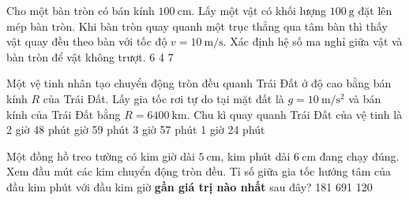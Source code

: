 \begin{ex}
	Cho một bàn tròn có bán kính $\SI{100}{\centi\meter}$. Lấy một vật có khối lượng $\SI{100}{\gram}$ đặt lên mép bàn tròn. Khi bàn tròn quay quanh một trục thẳng qua tâm bàn thì thấy vật quay đều theo bàn với tốc độ $v=\SI{10}{\meter/\second}$. Xác định hệ số ma nghỉ giữa vật và bàn tròn để vật không trượt.
	\choice
	{}
	{6}
	{4}
	{7}
\end{ex}
\begin{ex}
Một vệ tinh nhân tạo chuyển động tròn đều quanh Trái Đất ở độ cao bằng bán kính $R$ của Trái Đất. Lấy gia tốc rơi tự do tại mặt đất là $g=\SI{10}{\meter/\second^2}$ và bán kính của Trái Đất bằng $R=\SI{6400}{\kilo\meter}$. Chu kì quay quanh Trái Đất của vệ tinh là	
	\choice
	{2 giờ 48 phút}
	{ giờ 59 phút}
	{3 giờ 57 phút}
	{1 giờ 24 phút}
\end{ex}
\begin{ex}
	Một đồng hồ treo tường có kim giờ dài $\SI{5}{\centi\meter}$, kim phút dài $\SI{6}{\centi\meter}$ đang chạy đúng. Xem đầu mút các kim chuyển động tròn đều. Tỉ số giữa gia tốc hướng tâm của đầu kim phút với đầu kim giờ \textbf{gần giá trị nào nhất} sau đây?
	\choice
	{}
	{181}
	{691}
	{120}
\end{ex}

